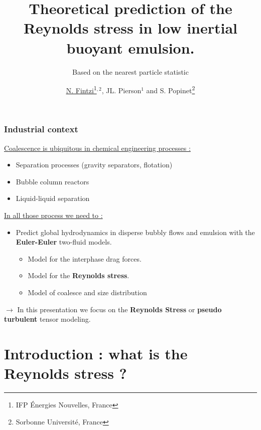 \documentclass{sintefbeamer}
\title{Theoretical prediction of the Reynolds stress in low inertial buoyant emulsion.}
\subtitle{Based on the nearest particle statistic}
\author{\href{http://basilisk.fr/sandbox/fintzin/Rising-Suspenion/RS.c}{\underline{N. Fintzi}\footnote{IFP \'Energies Nouvelles, France}$^{,2}$}, JL. Pierson$^1$ and S. Popinet\footnote{Sorbonne Universit\'e, France}}
\begin{document}
\maketitle


\begin{frame}
  \frametitle{Industrial context}
  \underline{Coalescence is ubiquitous in chemical engineering processes :}
  \begin{itemize}
    \item Separation processes (gravity separators, flotation)
    \item Bubble column reactors
    \item Liquid-liquid separation
  \end{itemize}
  \vfill
  \underline{In all those process we need to : }
  \begin{itemize}
    \item Predict global hydrodynamics in disperse bubbly flows and emulsion with 
    the \textbf{Euler-Euler} two-fluid models. 
    \begin{itemize}
      \item Model for the interphase drag forces.
      \item Model for the \textbf{Reynolds stress}.
      \item Model of coalesce and size distribution 
    \end{itemize}
  \end{itemize}

  \vfill
$\to$ In this presentation we focus on the \textbf{Reynolds Stress} or \textbf{pseudo turbulent} tensor modeling. 
\end{frame}

\section{Introduction : what is the Reynolds stress ?}
\end{document}

